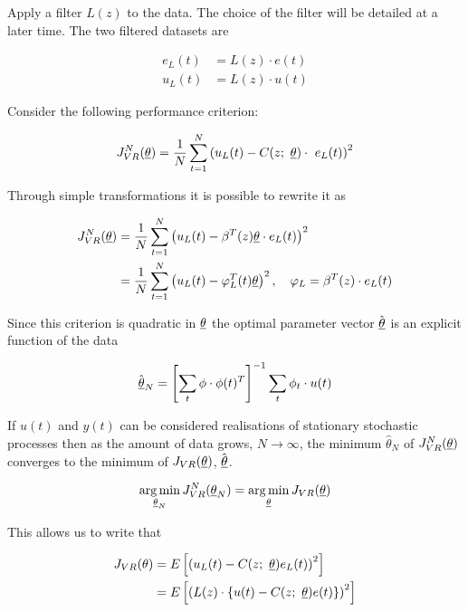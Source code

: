 Apply a filter \( L(z) \) to the data. The choice of the filter will be detailed at a later time.  The two filtered datasets are

\begin{align}
    e_L(t) &= L(z) \cdot e(t) \\
    u_L(t) &= L(z) \cdot u(t)
\end{align}

Consider the following performance criterion: 

\begin{equation}
    J^N_{VR}(\underline{\theta}) = 
        \frac{1}{N} \sum_{t=1}^{N} \left( u_L(t) - C(z;\ \underline{\theta}) \cdot \ e_L(t) \right)^2 
\end{equation}

Through simple transformations it is possible to rewrite it as

\begin{equation}
    \begin{aligned}
        J^N_{VR}(\underline{\theta})
            &= \frac{1}{N} \sum_{t=1}^{N}\left( u_L(t) - \beta^T(z)\underline{\theta} \cdot e_L(t) \right)^2 \\
            &= \frac{1}{N} \sum_{t=1}^{N}\left( u_L(t) - \varphi_L^T(t)\underline{\theta} \right)^2, \quad \varphi_L = \beta^T(z) \cdot  e_L(t)
    \end{aligned}    
\end{equation}


Since this criterion is quadratic in \( \underline{\theta} \) the optimal parameter vector \( \hat{\underline{\theta}} \) is an explicit function of the data

\begin{equation}
    \hat{\underline{\theta}}_N 
        = \left[ \sum_t \phi \cdot \phi(t)^T \right]^{-1} \sum_t \phi_t \cdot u(t) 
\end{equation}

If \( u(t) \) and \( y(t) \) can be considered realisations of stationary stochastic processes then as the amount of data grows, \( N \rightarrow \infty \), the minimum \( \hat{\theta}_N \) of \( J^N_{VR}(\underline{\theta}) \) converges to the minimum of \( J_{VR}(\underline{\theta}) \), \( \hat{\underline{\theta}} \).

\begin{equation*}
    \operatorname*{arg\,min}_{\underline{\theta}_N} J^N_{VR}(\underline{\theta}_N) = \operatorname*{arg\,min}_{\underline{\theta}} J_{VR}(\underline{\theta})
\end{equation*}

This allows us to write that

\begin{equation}
    \begin{aligned}
        J_{VR}(\theta) &= E \left[ \left( u_L(t) - C(z;\ \thetavec)e_L(t) \right)^2 \right] \\
                       &= E \left[ \left( L(z) \cdot \left\{ u(t) - C(z;\ \thetavec)e(t) \right\} \right)^2 \right]
    \end{aligned}
\end{equation}

